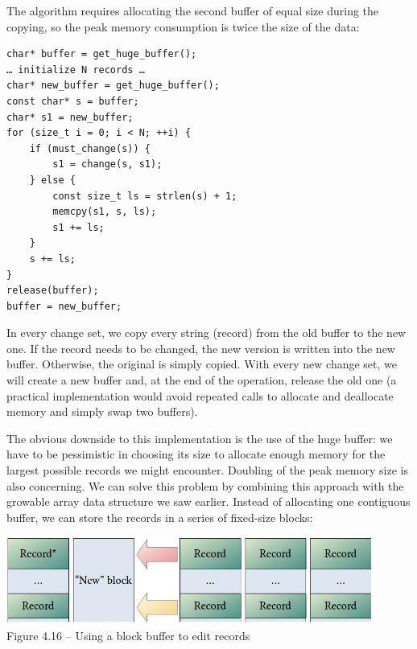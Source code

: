 The algorithm requires allocating the second buffer of equal size during the copying, so the peak memory consumption is twice the size of the data:

\begin{lstlisting}[style=styleCXX]
char* buffer = get_huge_buffer();
… initialize N records …
char* new_buffer = get_huge_buffer();
const char* s = buffer;
char* s1 = new_buffer;
for (size_t i = 0; i < N; ++i) {
	if (must_change(s)) {
		s1 = change(s, s1);
	} else {
		const size_t ls = strlen(s) + 1;
		memcpy(s1, s, ls);
		s1 += ls;
	}
	s += ls;
}
release(buffer);
buffer = new_buffer;
\end{lstlisting}

In every change set, we copy every string (record) from the old buffer to the new one. If the record needs to be changed, the new version is written into the new buffer. Otherwise, the original is simply copied. With every new change set, we will create a new buffer and, at the end of the operation, release the old one (a practical implementation would avoid repeated calls to allocate and deallocate memory and simply swap two buffers).

The obvious downside to this implementation is the use of the huge buffer: we have to be pessimistic in choosing its size to allocate enough memory for the largest possible records we might encounter. Doubling of the peak memory size is also concerning. We can solve this problem by combining this approach with the growable array data structure we saw earlier. Instead of allocating one contiguous buffer, we can store the records in a series of fixed-size blocks:

\begin{center}
\includegraphics[width=0.9\textwidth]{content/1/chapter4/images/16.jpg}\\
Figure 4.16 – Using a block buffer to edit records
\end{center}

